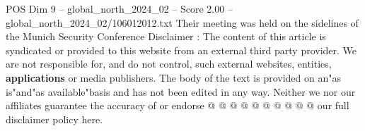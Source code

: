 \begin{textsample}{POS Dim 9 – global\_north\_2024\_02 – Score 2.00 – global\_north\_2024\_02/106012012.txt}
Their meeting was held on the sidelines of the Munich Security Conference Disclaimer : The content of this article is syndicated or provided to this website from an external third party provider.
We are not responsible for, and do not control, such external websites, entities, \textbf{applications} or media publishers.
The body of the text is provided on an"as is"and"as available"basis and has not been edited in any way.
Neither we nor our affiliates guarantee the accuracy of or endorse @ @ @ @ @ @ @ @ @ @ our full disclaimer policy here.

\end{textsample}
